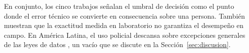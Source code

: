 En conjunto, los cinco trabajos se\~nalan el umbral de decisi\'on como el
punto donde el error t\'ecnico se convierte en consecuencia sobre una
persona. Tambi\'en muestran que la exactitud medida en laboratorio no
garantiza el desempe\~no en campo. En Am\'erica Latina, el uso policial
descansa sobre excepciones generales de las leyes de datos
\cite{franqueira_reconhecimento_2021}, un vac\'io que se discute en la
Secci\'on~\ref{sec:discusion}.
